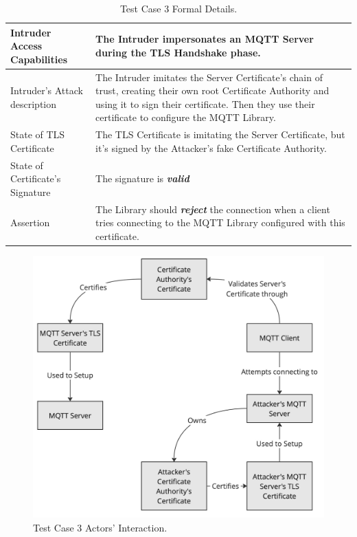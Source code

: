 \documentclass[binding=0.6cm,noexaminfo]{sapthesis}
\begin{document}
\begin{table}
\begin{center}
\begin{tabular}{| p{6cm} | p{6cm} |}
\hline
Intruder Access Capabilities & The Intruder impersonates an MQTT Server during the TLS Handshake phase. \\
\hline
Intruder’s Attack description & The Intruder imitates the Server Certificate’s chain of trust, creating their own root Certificate Authority and using it to sign their certificate. Then they use their certificate to configure the MQTT Library. \\
\hline
State of TLS Certificate & The TLS Certificate is imitating the Server Certificate, but it’s signed by the Attacker’s fake Certificate Authority. \\
\hline
State of Certificate’s Signature & The signature is \textbf{\textit{valid}} \\
\hline
Assertion & The Library should \textbf{\textit{reject}} the connection when a client tries connecting to the MQTT Library configured with this certificate. \\
\hline
\end{tabular}
\caption{Test Case 3 Formal Details.}
\label{tab:tc3}
\end{center}
\end{table}

\begin{figure}[htb]
	\includegraphics[width=14cm]{TC3}
	\caption{Test Case 3 Actors' Interaction.}
	\label{fig:tc3}
\end{figure}
\end{document}
